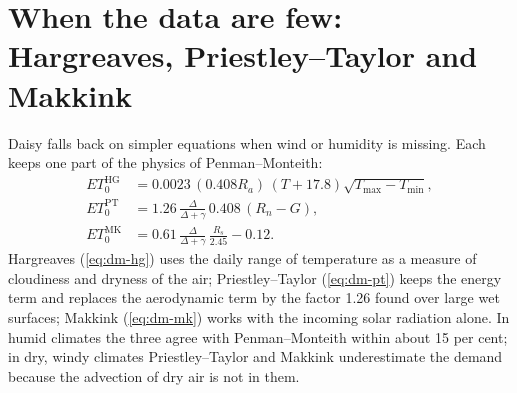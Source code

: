 \section{When the data are few: Hargreaves, Priestley--Taylor and Makkink}\label{sec:dm-alt}
Daisy falls back on simpler equations when wind or humidity is missing. Each keeps one part of the physics of Penman--Monteith:
\begin{align}
ET_0^{\mathrm{HG}}&=0.0023\,(0.408R_a)\,(T+17.8)\sqrt{T_{\max}-T_{\min}} ,\label{eq:dm-hg}\\
ET_0^{\mathrm{PT}}&=1.26\,\frac{\Delta}{\Delta+\gamma}\,0.408\,(R_n-G) ,\label{eq:dm-pt}\\
ET_0^{\mathrm{MK}}&=0.61\,\frac{\Delta}{\Delta+\gamma}\,\frac{R_s}{2.45}-0.12 .\label{eq:dm-mk}
\end{align}
Hargreaves (\ref{eq:dm-hg}) uses the daily range of temperature as a measure of cloudiness and dryness of the air; Priestley--Taylor (\ref{eq:dm-pt}) keeps the energy term and replaces the aerodynamic term by the factor 1.26 found over large wet surfaces; Makkink (\ref{eq:dm-mk}) works with the incoming solar radiation alone. In humid climates the three agree with Penman--Monteith within about 15 per cent; in dry, windy climates Priestley--Taylor and Makkink underestimate the demand because the advection of dry air is not in them.

